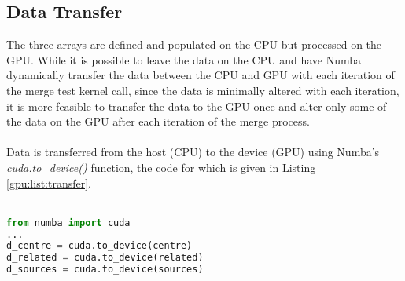 \subsection{Data Transfer}
The three arrays are defined and populated on the CPU but processed on the GPU. While it is possible to leave the data on the CPU and have Numba dynamically transfer the data between the CPU and GPU with each iteration of the merge test kernel call, since the data is minimally altered with each iteration, it is more feasible to transfer the data to the GPU once and alter only some of the data on the GPU after each iteration of the merge process.
\\
\\
Data is transferred from the host (CPU) to the device (GPU) using Numba's \textit{cuda.to\_device()} function, the code for which is given in Listing \ref{gpu:list:transfer}.
\\
\\
\begin{lstlisting}[language=Python, label=gpu:list:transfer]
from numba import cuda
...
d_centre = cuda.to_device(centre)
d_related = cuda.to_device(related)
d_sources = cuda.to_device(sources)
\end{lstlisting}
